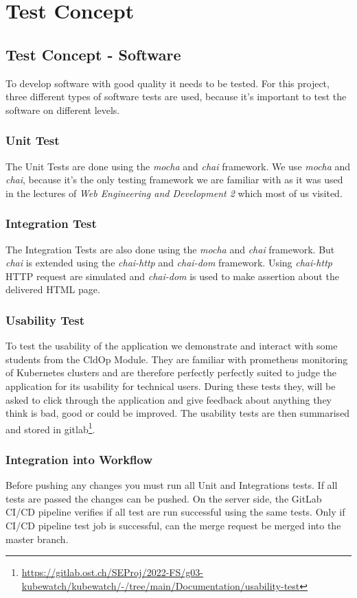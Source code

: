\chapter{Test Concept}

\section{Test Concept - Software}
To develop software with good quality it needs to be tested.
For this project, three different types of software tests are used, because it's important to test the software on different levels.

\subsection{Unit Test}
The Unit Tests are done using the \textit{mocha} and \textit{chai} framework. We use \textit{mocha} and \textit{chai}, because it's the only testing framework we are familiar with as it was used in the lectures of \textit{Web Engineering and Development 2} which most of us visited.

\subsection{Integration Test}
The Integration Tests are also done using the \textit{mocha} and \textit{chai} framework.
But \textit{chai} is extended using the \textit{chai-http} and \textit{chai-dom} framework.
Using \textit{chai-http} HTTP request are simulated and \textit{chai-dom} is used to make assertion about the delivered HTML page.

\subsection{Usability Test}
To test the usability of the application we demonstrate and interact with some students from the CldOp Module.
They are familiar with prometheus monitoring of Kubernetes clusters and are therefore perfectly perfectly suited to judge the application for its usability for technical users.
During these tests they, will be asked to click through the application
and give feedback about anything they think is bad, good or could be improved.
The usability tests are then summarised and stored in gitlab\footnote{\url{https://gitlab.ost.ch/SEProj/2022-FS/g03-kubewatch/kubewatch/-/tree/main/Documentation/usability-test}}.

\subsection{Integration into Workflow}
Before pushing any changes you must run all Unit and Integrations tests.
If all tests are passed the changes can be pushed.
On the server side, the GitLab CI/CD pipeline verifies if all test are run successful using the same tests.
Only if CI/CD pipeline test job is successful, can the merge request be merged into the master branch.

